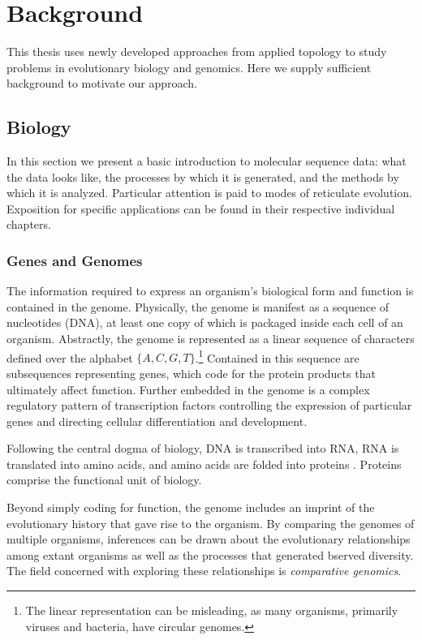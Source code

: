 \chapter{Background}
\label{ch:background}

This thesis uses newly developed approaches from applied topology to study problems in evolutionary biology and genomics.
Here we supply sufficient background to motivate our approach.

\section{Biology}

In this section we present a basic introduction to molecular sequence data: what the data looks like, the processes by which it is generated, and the methods by which it is analyzed.
Particular attention is paid to modes of reticulate evolution.
Exposition for specific applications can be found in their respective individual chapters.

\subsection{Genes and Genomes}

The information required to express an organism's biological form and function is contained in the genome.
Physically, the genome is manifest as a sequence of nucleotides (DNA), at least one copy of which is packaged inside each cell of an organism.
Abstractly, the genome is represented as a linear sequence of characters defined over the alphabet $\{A,C,G,T\}$.\footnote{The linear representation can be misleading, as many organisms, primarily viruses and bacteria, have circular genomes.}
Contained in this sequence are subsequences representing genes, which code for the protein products that ultimately affect function.
Further embedded in the genome is a complex regulatory pattern of transcription factors controlling the expression of particular genes and directing cellular differentiation and development.

Following the central dogma of biology, DNA is transcribed into RNA, RNA is translated into amino acids, and amino acids are folded into proteins \cite{Crick:1970wb}.
Proteins comprise the functional unit of biology.

Beyond simply coding for function, the genome includes an imprint of the evolutionary history that gave rise to the organism.
By comparing the genomes of multiple organisms, inferences can be drawn about the evolutionary relationships among extant organisms as well as the processes that generated bserved diversity.
The field concerned with exploring these relationships is \emph{comparative genomics}.

